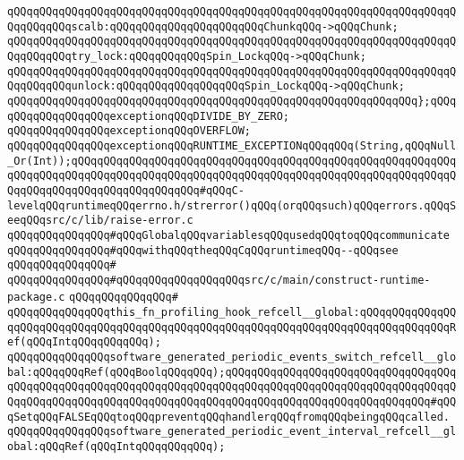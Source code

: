 \verb|qQQqqQQqqQQqqQQqqQQqqQQqqQQqqQQqqQQqqQQqqQQqqQQqqQQqqQQqqQQqqQQqqQQqqQQqqQQqqQQqscalb:qQQqqQQqqQQqqQQqqQQqqQQqChunkqQQq->qQQqChunk;|\newline
\verb|qQQqqQQqqQQqqQQqqQQqqQQqqQQqqQQqqQQqqQQqqQQqqQQqqQQqqQQqqQQqqQQqqQQqqQQqqQQqqQQqtry_lock:qQQqqQQqqQQqSpin_LockqQQq->qQQqChunk;|\newline
\verb|qQQqqQQqqQQqqQQqqQQqqQQqqQQqqQQqqQQqqQQqqQQqqQQqqQQqqQQqqQQqqQQqqQQqqQQqqQQqqQQqunlock:qQQqqQQqqQQqqQQqqQQqSpin_LockqQQq->qQQqChunk;|\newline
\verb|qQQqqQQqqQQqqQQqqQQqqQQqqQQqqQQqqQQqqQQqqQQqqQQqqQQqqQQqqQQqqQQq};qQQq|\newline
\newline
\verb|qQQqqQQqqQQqqQQqexceptionqQQqDIVIDE_BY_ZERO;|\newline
\verb|qQQqqQQqqQQqqQQqexceptionqQQqOVERFLOW;|\newline
\verb|qQQqqQQqqQQqqQQqexceptionqQQqRUNTIME_EXCEPTIONqQQqqQQq(String,qQQqNull_Or(Int));qQQqqQQqqQQqqQQqqQQqqQQqqQQqqQQqqQQqqQQqqQQqqQQqqQQqqQQqqQQqqQQqqQQqqQQqqQQqqQQqqQQqqQQqqQQqqQQqqQQqqQQqqQQqqQQqqQQqqQQqqQQqqQQqqQQqqQQqqQQqqQQqqQQqqQQqqQQqqQQq#qQQqC-levelqQQqruntimeqQQqerrno.h/strerror()qQQq(orqQQqsuch)qQQqerrors.qQQqSeeqQQqsrc/c/lib/raise-error.c|\newline
\newline
\verb|qQQqqQQqqQQqqQQq#qQQqGlobalqQQqvariablesqQQqusedqQQqtoqQQqcommunicate|\newline
\verb|qQQqqQQqqQQqqQQq#qQQqwithqQQqtheqQQqCqQQqruntimeqQQq--qQQqsee|\newline
\verb|qQQqqQQqqQQqqQQq#|\newline
\verb|qQQqqQQqqQQqqQQq#qQQqqQQqqQQqqQQqqQQqsrc/c/main/construct-runtime-package.c|\newline
\verb|qQQqqQQqqQQqqQQq#|\newline
\verb|qQQqqQQqqQQqqQQqthis_fn_profiling_hook_refcell__global:qQQqqQQqqQQqqQQqqQQqqQQqqQQqqQQqqQQqqQQqqQQqqQQqqQQqqQQqqQQqqQQqqQQqqQQqqQQqqQQqqQQqRef(qQQqIntqQQqqQQqqQQq);|\newline
\verb|qQQqqQQqqQQqqQQqsoftware_generated_periodic_events_switch_refcell__global:qQQqqQQqRef(qQQqBoolqQQqqQQq);qQQqqQQqqQQqqQQqqQQqqQQqqQQqqQQqqQQqqQQqqQQqqQQqqQQqqQQqqQQqqQQqqQQqqQQqqQQqqQQqqQQqqQQqqQQqqQQqqQQqqQQqqQQqqQQqqQQqqQQqqQQqqQQqqQQqqQQqqQQqqQQqqQQqqQQqqQQqqQQqqQQqqQQqqQQq#qQQqSetqQQqFALSEqQQqtoqQQqpreventqQQqhandlerqQQqfromqQQqbeingqQQqcalled.|\newline
\verb|qQQqqQQqqQQqqQQqsoftware_generated_periodic_event_interval_refcell__global:qQQqRef(qQQqIntqQQqqQQqqQQq);|\newline
